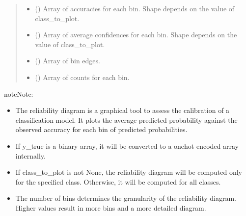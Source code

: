 \documentclass[letterpaper,10pt,english]{sphinxmanual}
\begin{document}
\begin{fulllineitems}
\begin{quote}
\begin{description}
\begin{itemize}
\end{itemize}

\begin{itemize}
\item {} 
\sphinxAtStartPar
{} () \textendash{} Array of accuracies for each bin. Shape depends on the value of class\_to\_plot.

\item {} 
\sphinxAtStartPar
{} () \textendash{} Array of average confidences for each bin. Shape depends on the value of class\_to\_plot.

\item {} 
\sphinxAtStartPar
{} () \textendash{} Array of bin edges.

\item {} 
\sphinxAtStartPar
{} () \textendash{} Array of counts for each bin.

\end{itemize}

\end{description}\end{quote}

\begin{sphinxadmonition}{note}{Note:}\begin{itemize}
\item {} 
\sphinxAtStartPar
The reliability diagram is a graphical tool to assess the calibration of a classification model. It plots the average predicted probability against the observed accuracy for each bin of predicted probabilities.

\item {} 
\sphinxAtStartPar
If y\_true is a binary array, it will be converted to a one\sphinxhyphen{}hot encoded array internally.

\item {} 
\sphinxAtStartPar
If class\_to\_plot is not None, the reliability diagram will be computed only for the specified class. Otherwise, it will be computed for all classes.

\item {} 
\sphinxAtStartPar
The number of bins determines the granularity of the reliability diagram. Higher values result in more bins and a more detailed diagram.

\end{itemize}
\end{sphinxadmonition}

\end{fulllineitems}
\end{document}
